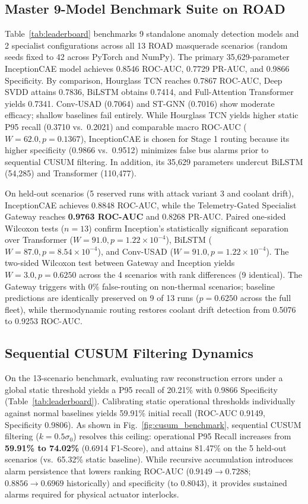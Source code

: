\documentclass[conference]{IEEEtran}
\begin{document}
\subsection{Master 9-Model Benchmark Suite on ROAD}
Table~\ref{tab:leaderboard} benchmarks 9 standalone anomaly detection models and 2 specialist configurations across all 13 ROAD masquerade scenarios (random seeds fixed to 42 across PyTorch and NumPy). The primary 35,629-parameter InceptionCAE model achieves 0.8546 ROC-AUC, 0.7729 PR-AUC, and 0.9866 Specificity. By comparison, Hourglass TCN reaches 0.7867 ROC-AUC, Deep SVDD attains 0.7836, BiLSTM obtains 0.7414, and Full-Attention Transformer yields 0.7341. Conv-USAD (0.7064) and ST-GNN (0.7016) show moderate efficacy; shallow baselines fail entirely. While Hourglass TCN yields higher static P95 recall (0.3710 vs.\ 0.2021) and comparable macro ROC-AUC ($W=62.0, p=0.1367$), InceptionCAE is chosen for Stage 1 routing because its higher specificity (0.9866 vs.\ 0.9512) minimizes false bus alarms prior to sequential CUSUM filtering. In addition, its 35,629 parameters undercut BiLSTM (54,285) and Transformer (110,477).

On held-out scenarios (5 reserved runs with attack variant 3 and coolant drift), InceptionCAE achieves 0.8848 ROC-AUC, while the Telemetry-Gated Specialist Gateway reaches \textbf{0.9763 ROC-AUC} and 0.8268 PR-AUC. Paired one-sided Wilcoxon tests ($n=13$) confirm Inception's statistically significant separation over Transformer ($W=91.0, p=1.22\times 10^{-4}$), BiLSTM ($W=87.0, p=8.54\times 10^{-4}$), and Conv-USAD ($W=91.0, p=1.22\times 10^{-4}$). The two-sided Wilcoxon test between Gateway and Inception yields $W=3.0, p=0.6250$ across the 4 scenarios with rank differences (9 identical). The Gateway triggers with 0\% false-routing on non-thermal scenarios; baseline predictions are identically preserved on 9 of 13 runs ($p=0.6250$ across the full fleet), while thermodynamic routing restores coolant drift detection from 0.5076 to 0.9253 ROC-AUC.

\subsection{Sequential CUSUM Filtering Dynamics}
On the 13-scenario benchmark, evaluating raw reconstruction errors under a global static threshold yields a P95 recall of 20.21\% with 0.9866 Specificity (Table~\ref{tab:leaderboard}). Calibrating static operational thresholds individually against normal baselines yields 59.91\% initial recall (ROC-AUC 0.9149, Specificity 0.9806). As shown in Fig.~\ref{fig:cusum_benchmark}, sequential CUSUM filtering ($k=0.5\sigma_0$) resolves this ceiling: operational P95 Recall increases from \textbf{59.91\% to 74.02\%} (0.6914 F1-Score), and attains 81.47\% on the 5 held-out scenarios (vs.\ 65.32\% static baseline). While recursive accumulation introduces alarm persistence that lowers ranking ROC-AUC ($0.9149 \rightarrow 0.7288$; $0.8856 \rightarrow 0.6969$ historically) and specificity (to 0.8043), it provides sustained alarms required for physical actuator interlocks.
\end{document}
